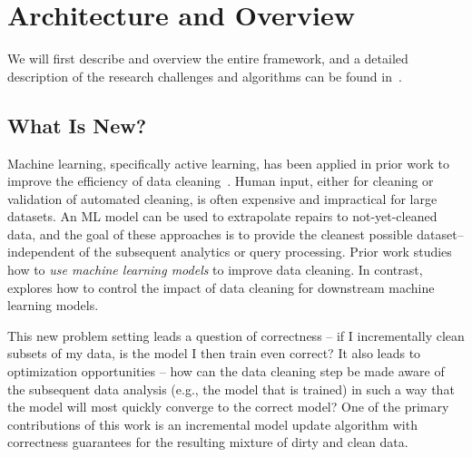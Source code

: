 \section{Architecture and Overview}\label{arch}
We will first describe \sys and overview the entire framework, and a detailed description of the research challenges and algorithms can be found in~\cite{activecleanarxiv}.

\subsection{What Is New?}
Machine learning, specifically active learning, has been applied in prior work to improve the efficiency of data cleaning~\cite{yakout2013don,DBLP:journals/pvldb/YakoutENOI11,gokhale2014corleone}.
Human input, either for cleaning or validation of automated cleaning, is often expensive and impractical for large datasets.
An ML model can be used to extrapolate repairs to not-yet-cleaned data, and the goal of these approaches is to provide the cleanest possible dataset--independent of the subsequent analytics or query processing.
Prior work studies how to \emph{use machine learning models} to improve data cleaning.
In contrast, \sys explores how to control the impact of data cleaning for downstream machine learning models.

This new problem setting leads a question of correctness -- if I incrementally clean subsets of my data, is the model I then train even correct?  
It also leads to optimization opportunities -- how can the data cleaning step be made aware of the subsequent data analysis (e.g., the model that is trained) 
in such a way that the model will most quickly converge to the correct model?
One of the primary contributions of this work is an incremental model update algorithm with correctness guarantees for the resulting mixture of dirty and clean data.

